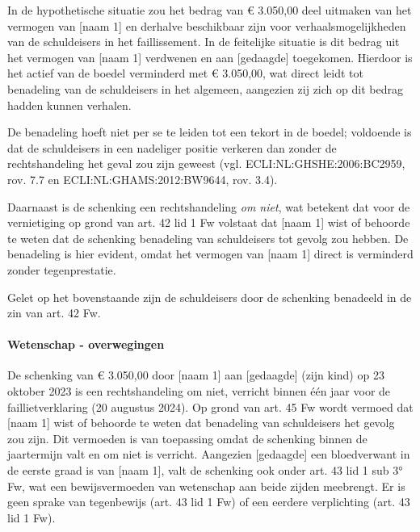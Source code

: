\documentclass[
  dutch,
  a4paper,
]{article}
\begin{document}
In de hypothetische situatie zou het bedrag van € 3.050,00 deel uitmaken van het vermogen van {[}naam 1{]} en derhalve beschikbaar zijn voor verhaalsmogelijkheden van de schuldeisers in het faillissement. In de feitelijke situatie is dit bedrag uit het vermogen van {[}naam 1{]} verdwenen en aan {[}gedaagde{]} toegekomen. Hierdoor is het actief van de boedel verminderd met € 3.050,00, wat direct leidt tot benadeling van de schuldeisers in het algemeen, aangezien zij zich op dit bedrag hadden kunnen verhalen.

De benadeling hoeft niet per se te leiden tot een tekort in de boedel; voldoende is dat de schuldeisers in een nadeliger positie verkeren dan zonder de rechtshandeling het geval zou zijn geweest (vgl. ECLI:NL:GHSHE:2006:BC2959, rov. 7.7 en ECLI:NL:GHAMS:2012:BW9644, rov. 3.4).

Daarnaast is de schenking een rechtshandeling \emph{om niet}, wat betekent dat voor de vernietiging op grond van art. 42 lid 1 Fw volstaat dat {[}naam 1{]} wist of behoorde te weten dat de schenking benadeling van schuldeisers tot gevolg zou hebben. De benadeling is hier evident, omdat het vermogen van {[}naam 1{]} direct is verminderd zonder tegenprestatie.

Gelet op het bovenstaande zijn de schuldeisers door de schenking benadeeld in de zin van art. 42 Fw.

\paragraph{Wetenschap - overwegingen}\label{wetenschap---overwegingen-30}

De schenking van € 3.050,00 door {[}naam 1{]} aan {[}gedaagde{]} (zijn kind) op 23 oktober 2023 is een rechtshandeling om niet, verricht binnen één jaar voor de faillietverklaring (20 augustus 2024). Op grond van art. 45 Fw wordt vermoed dat {[}naam 1{]} wist of behoorde te weten dat benadeling van schuldeisers het gevolg zou zijn. Dit vermoeden is van toepassing omdat de schenking binnen de jaartermijn valt en om niet is verricht. Aangezien {[}gedaagde{]} een bloedverwant in de eerste graad is van {[}naam 1{]}, valt de schenking ook onder art. 43 lid 1 sub 3° Fw, wat een bewijsvermoeden van wetenschap aan beide zijden meebrengt. Er is geen sprake van tegenbewijs (art. 43 lid 1 Fw) of een eerdere verplichting (art. 43 lid 1 Fw).

\newpage

\end{document}
